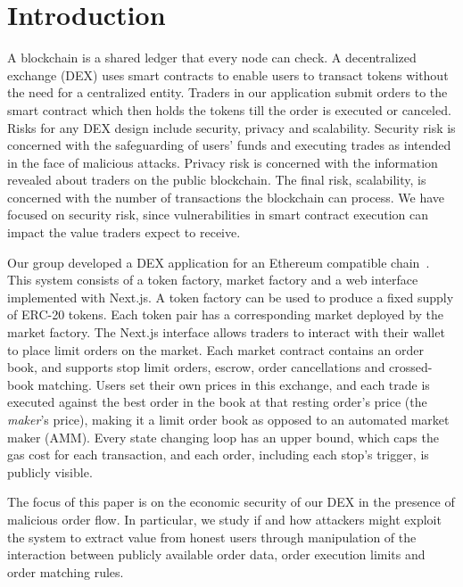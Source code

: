 \section{Introduction}\label{sec:intro}

A blockchain is a shared ledger that every node can check.
A decentralized exchange (DEX) uses smart contracts to enable users to transact tokens without the need for a centralized entity.
Traders in our application submit orders to the smart contract which then holds the tokens till the order is executed or canceled. %
Risks for any DEX design include security, privacy and scalability.
Security risk is concerned with the safeguarding of users' funds and executing trades as intended in the face of malicious attacks.
Privacy risk is concerned with the information revealed about traders on the public blockchain.
The final risk, scalability, is concerned with the number of transactions the blockchain can process.
We have focused on security risk, since vulnerabilities in smart contract execution can impact the value traders expect to receive.

Our group developed a DEX application for an Ethereum compatible chain~\cite{repo8753521}. %
This system consists of a token factory, market factory and a web interface implemented with Next.js. %
A token factory can be used to produce a fixed supply of ERC-20 tokens. %
Each token pair has a corresponding market deployed by the market factory. %
The Next.js interface allows traders to interact with their wallet to place limit orders on the market.
Each market contract contains an order book, and supports stop limit orders, escrow, order cancellations and crossed-book matching. %
Users set their own prices in this exchange, and each trade is executed against the best order in the book at that resting order's price (the \emph{maker}'s price), making it a limit order book as opposed to an automated market maker (AMM). %
Every state changing loop has an upper bound, which caps the gas cost for each transaction, and each order, including each stop's trigger, is publicly visible. %

The focus of this paper is on the economic security of our DEX in the presence of malicious order flow.
In particular, we study if and how attackers might exploit the system to extract value from honest users through manipulation of the interaction between publicly available order data, order execution limits and order matching rules. %

